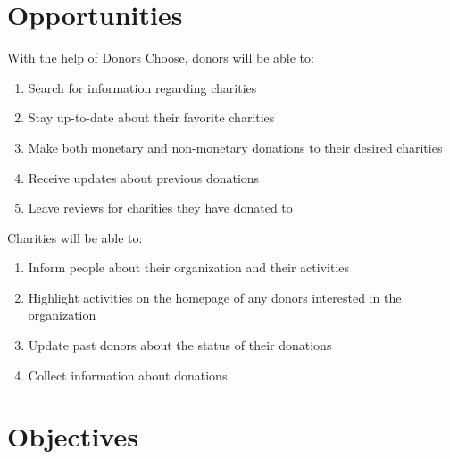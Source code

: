 \documentclass{scrreprt}
\begin{document}
    \section{Opportunities}
    
    With the help of Donors Choose, donors will be able to:
    
        \begin{enumerate}
            \item Search for information regarding charities
            \item Stay up-to-date about their favorite charities
            \item Make both monetary and non-monetary donations to their desired charities
            \item Receive updates about previous donations
            \item Leave reviews for charities they have donated to
        \end{enumerate}

    Charities will be able to:
        
        \begin{enumerate}
            \item Inform people about their organization and their activities
            \item Highlight activities on the homepage of any donors interested in the organization
            \item Update past donors about the status of their donations
            \item Collect information about donations
        \end{enumerate}
    
    \section{Objectives}
        
\end{document}
